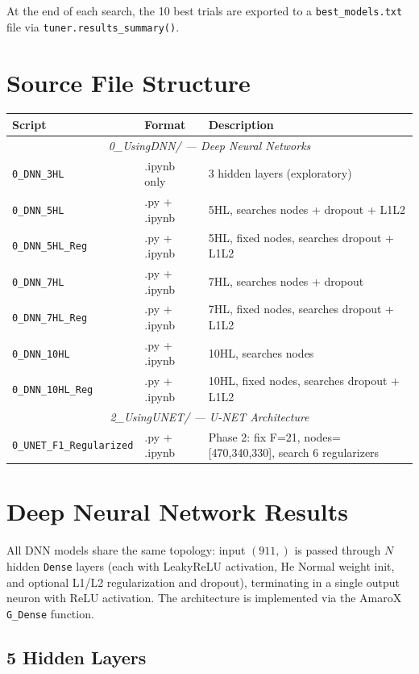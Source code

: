 \documentclass[11pt,a4paper]{article}
\begin{document}
At the end of each search, the 10 best trials are exported to a \texttt{best\_models.txt} file via \texttt{tuner.results\_summary()}.

\section{Source File Structure}

\begin{longtable}{lll}
\toprule
\textbf{Script} & \textbf{Format} & \textbf{Description} \\
\midrule
\multicolumn{3}{c}{\textit{0\_UsingDNN/ — Deep Neural Networks}} \\
\midrule
\texttt{0\_DNN\_3HL} & .ipynb only & 3 hidden layers (exploratory) \\
\texttt{0\_DNN\_5HL} & .py + .ipynb & 5HL, searches nodes + dropout + L1L2 \\
\texttt{0\_DNN\_5HL\_Reg} & .py + .ipynb & 5HL, fixed nodes, searches dropout + L1L2 \\
\texttt{0\_DNN\_7HL} & .py + .ipynb & 7HL, searches nodes + dropout \\
\texttt{0\_DNN\_7HL\_Reg} & .py + .ipynb & 7HL, fixed nodes, searches dropout + L1L2 \\
\texttt{0\_DNN\_10HL} & .py + .ipynb & 10HL, searches nodes \\
\texttt{0\_DNN\_10HL\_Reg} & .py + .ipynb & 10HL, fixed nodes, searches dropout + L1L2 \\
\midrule
\multicolumn{3}{c}{\textit{2\_UsingUNET/ — U-NET Architecture}} \\
\midrule
\texttt{0\_UNET\_F1\_Regularized} & .py + .ipynb & Phase 2: fix F=21, nodes=[470,340,330], search 6 regularizers \\
\bottomrule
\end{longtable}

\section{Deep Neural Network Results}

All DNN models share the same topology: input $(911,)$ is passed through $N$ hidden \texttt{Dense} layers (each with LeakyReLU activation, He Normal weight init, and optional L1/L2 regularization and dropout), terminating in a single output neuron with ReLU activation. The architecture is implemented via the AmaroX \texttt{G\_Dense} function.

\subsection{5 Hidden Layers}
\end{document}
